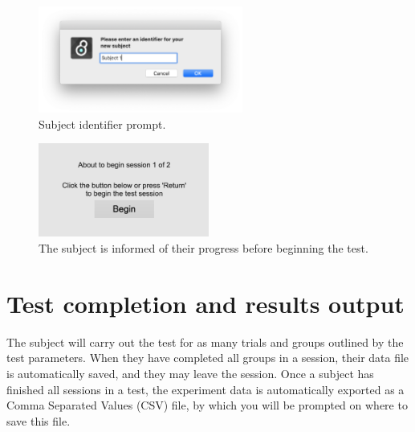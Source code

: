 \begin{figure}[ht]
	\centering
	\includegraphics[width=0.6\textwidth]{./images/run_identifier.png}
	\caption{Subject identifier prompt.}
	\label{run::indentifier}
\end{figure}

\begin{figure}[ht]
	\centering
	\includegraphics[width=0.5\textwidth]{./images/run_begin.png}
	\caption{The subject is informed of their progress before beginning the test.}
	\label{run::begin}
\end{figure}

\section{Test completion and results output}
The subject will carry out the test for as many trials and groups outlined by the test parameters. When they have completed all groups in a session, their data file is automatically saved, and they may leave the session. Once a subject has finished all sessions in a test, the experiment data is automatically exported as a Comma Separated Values (CSV) file, by which you will be prompted on where to save this file.